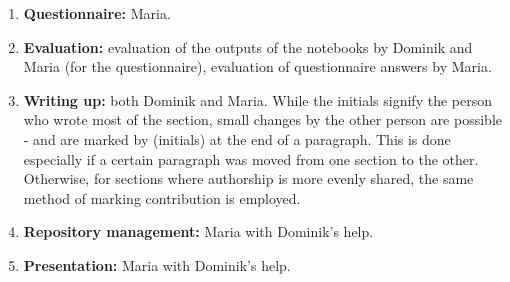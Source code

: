 \documentclass[11pt]{article}
\begin{document}
\begin{enumerate}
    \item \textbf{Questionnaire:} Maria.
    \item \textbf{Evaluation:} evaluation of the outputs of the notebooks by Dominik and Maria (for the questionnaire), evaluation of questionnaire answers by Maria.
    \item \textbf{Writing up:} both Dominik and Maria. While the initials signify the person who wrote most of the section, small changes by the other person are possible - and are marked by (initials) at the end of a paragraph. This is done especially if a certain paragraph was moved from one section to the other. Otherwise, for sections where authorship is more evenly shared, the same method of marking contribution is employed.
    \item \textbf{Repository management:} Maria with Dominik's help.
    \item \textbf{Presentation:} Maria with Dominik's help.
\end{enumerate}
\end{document}
